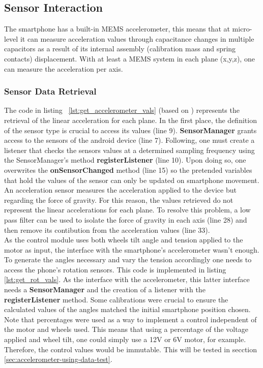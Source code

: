 \subsection{Sensor Interaction}%
\label{sec:accelerometer-access}
%
The smartphone has a built-in MEMS accelerometer, this means that at micro-level it can measure acceleration values through capacitance changes in multiple capacitors as a result of its internal assembly (calibration mass and spring contacts) displacement. With at least a MEMS system in each plane (x,y,z), one can measure the acceleration per axis. 
\subsubsection{Sensor Data Retrieval}
\label{sec:accelerometer-data}
%
The code in listing ~\ref{lst:get_accelerometer_vals} (based on \cite{androiddevsensors}) represents the retrieval of the linear acceleration for each plane.
In the first place, the definition of the sensor type is crucial to access its values (line 9). \textbf{SensorManager} grants access to the sensors of the android device (line 7). Following, one must create a listener that checks the sensors values at a determined sampling frequency using the SensorManager's method \textbf{registerListener} (line 10). Upon doing so, one overwrites the \textbf{onSensorChanged} method (line 15) so the pretended variables that hold the values of the sensor can only be updated on smartphone movement.
An acceleration sensor measures the acceleration applied to the device but regarding the force of gravity. For this reason, the values retrieved do not represent the linear accelerations for each plane. To resolve this problem, a low pass filter can be used to isolate the force of gravity in each axis (line 28) and then remove its contibution from the acceleration values (line 33).\\
%

%
As the control module uses both wheels tilt angle and tension applied to the motor as input, the interface with the smartphone's accelerometer wasn't enough. To generate the angles necessary and vary the tension accordingly one needs to access the phone's rotation sensors. This code is implemented in listing \ref{lst:get_rot_vals}. As the interface with the accelerometer, this latter interface needs a \textbf{SensorManager} and the creation of a listener with the \textbf{registerListener} method. Some calibrations were crucial to ensure the calculated values of the angles matched the initial smartphone position chosen. Note that percentages were used as a way to implement a control independent of the motor and wheels used. This means that using a percentage of the voltage applied and wheel tilt, one could simply use a 12V or 6V motor, for example. Therefore, the control values would be immutable. This will be tested in secction \ref{sec:accelerometer-using-data-test}.\\

